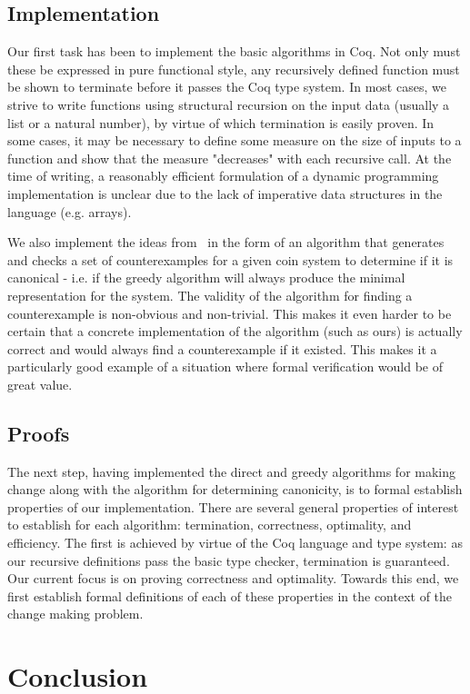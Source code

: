 \documentclass{acm_proc_article-sp}
\begin{document}
\subsection{Implementation}

Our first task has been to implement the basic algorithms in Coq. Not only must these be expressed in pure functional style, any recursively defined function must be shown to terminate before it passes the Coq type system. In most cases, we strive to write functions using structural recursion on the input data (usually a list or a natural number), by virtue of which termination is easily proven. In some cases, it may be necessary to define some measure on the size of inputs to a function and show that the measure "decreases" with each recursive call. At the time of writing, a reasonably efficient formulation of a dynamic programming implementation is unclear due to the lack of imperative data structures in the language (e.g. arrays).

We also implement the ideas from~\cite{?} in the form of an algorithm that generates and checks a set of counterexamples for a given coin system to determine if it is canonical - i.e. if the greedy algorithm will always produce the minimal representation for the system. The validity of the algorithm for finding a counterexample is non-obvious and non-trivial. This makes it even harder to be certain that a concrete implementation of the algorithm (such as ours) is actually correct and would always find a counterexample if it existed. This makes it a particularly good example of a situation where formal verification would be of great value. 


\subsection{Proofs}

The next step, having implemented the direct and greedy algorithms for making change along with the algorithm for determining canonicity, is to formal establish properties of our implementation. There are several general properties of interest to establish for each algorithm: termination, correctness, optimality, and efficiency. The first is achieved by virtue of the Coq language and type system: as our recursive definitions pass the basic type checker, termination is guaranteed. Our current focus is on proving correctness and optimality. Towards this end, we first establish formal definitions of each of these properties in the context of the change making problem. 





\section{Conclusion}




\end{document}
